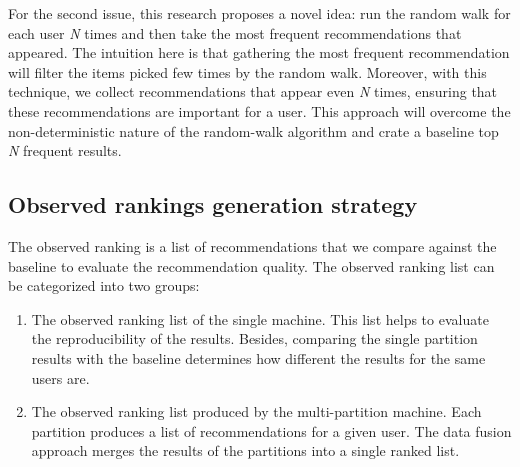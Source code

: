 For the second issue, this research proposes a novel idea: run the random walk for each user \emph{N} times and then take the most frequent recommendations that appeared. The intuition here is that gathering the most frequent recommendation will filter the items picked few times by the random walk. Moreover, with this technique, we collect recommendations that appear even \emph{N} times, ensuring that these recommendations are important for a user. This approach will overcome the non-deterministic nature of the random-walk algorithm and crate a baseline top \emph{N} frequent results.


\subsection{Observed rankings generation strategy}
\label{subsec:comparing-recommendtions}
The observed ranking is a list of recommendations that we compare against the baseline to evaluate the recommendation quality. The observed ranking list can be categorized into two groups:

\begin{enumerate}
    \item The observed ranking list of the single machine. This list helps to evaluate the reproducibility of the results. Besides, comparing the single partition results with the baseline determines how different the results for the same users are. 
    
    \item The observed ranking list produced by the multi-partition machine. Each partition produces a list of recommendations for a given user. The data fusion approach merges the results of the partitions into a single ranked list. 
\end{enumerate}
